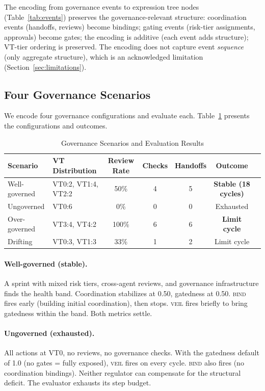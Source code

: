 \documentclass[sigconf,nonacm]{acmart}
\begin{document}
The encoding from governance events to expression tree nodes
(Table~\ref{tab:events}) preserves the governance-relevant structure:
coordination events (handoffs, reviews) become bindings; gating events
(risk-tier assignments, approvals) become gates; the encoding is
additive (each event adds structure); VT-tier ordering is preserved.
The encoding does not capture event \emph{sequence} (only aggregate
structure), which is an acknowledged limitation
(Section~\ref{sec:limitations}).

\subsection{Four Governance Scenarios}\label{sec:scenarios}

We encode four governance configurations and evaluate each.
Table~\ref{tab:scenarios} presents the configurations and outcomes.

\begin{table}[t]
  \caption{Governance Scenarios and Evaluation Results}\label{tab:scenarios}
  \small
  \begin{tabular}{@{}llccccl@{}}
    \toprule
    \textbf{Scenario} & \textbf{VT Distribution} & \textbf{Review Rate} & \textbf{Checks} & \textbf{Handoffs} & \textbf{Outcome} \\
    \midrule
    \rowcolor{cellgreen}
    Well-governed & VT0:2, VT1:4, VT2:2 & 50\% & 4 & 5 & \textbf{Stable (18 cycles)} \\
    Ungoverned & VT0:6 & 0\% & 0 & 0 & Exhausted \\
    \rowcolor{cellamber}
    Over-governed & VT3:4, VT4:2 & 100\% & 6 & 6 & \textbf{Limit cycle} \\
    Drifting & VT0:3, VT1:3 & 33\% & 1 & 2 & Limit cycle \\
    \bottomrule
  \end{tabular}
\end{table}

\paragraph{Well-governed (stable).}
A sprint with mixed risk tiers, cross-agent reviews, and governance
infrastructure finds the health band. Coordination stabilizes at 0.50,
gatedness at 0.50. \textsc{bind} fires early (building initial
coordination), then stops. \textsc{veil} fires briefly to bring
gatedness within the band. Both metrics settle.

\paragraph{Ungoverned (exhausted).}
All actions at VT0, no reviews, no governance checks. With the gatedness
default of 1.0 (no gates = fully exposed), \textsc{veil} fires on every
cycle. \textsc{bind} also fires (no coordination bindings). Neither
regulator can compensate for the structural deficit. The evaluator
exhausts its step budget.
\end{document}
